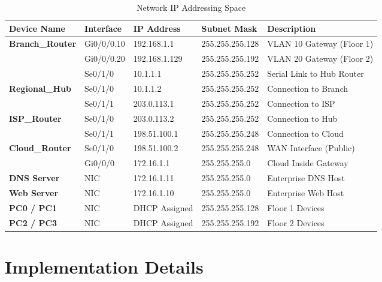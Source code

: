 \documentclass[12pt,a4paper]{article}
\begin{document}
\begin{table}[htbp]
\centering
\small
\caption{Network IP Addressing Space}
\begin{tabular}{lllll}
\toprule
\textbf{Device Name} & \textbf{Interface} & \textbf{IP Address} & \textbf{Subnet Mask} & \textbf{Description} \\ \midrule
\textbf{Branch\_Router} & Gi0/0/0.10 & 192.168.1.1 & 255.255.255.128 & VLAN 10 Gateway (Floor 1) \\
 & Gi0/0/0.20 & 192.168.1.129 & 255.255.255.192 & VLAN 20 Gateway (Floor 2) \\
 & Se0/1/0 & 10.1.1.1 & 255.255.255.252 & Serial Link to Hub Router \\ \midrule
\textbf{Regional\_Hub} & Se0/1/0 & 10.1.1.2 & 255.255.255.252 & Connection to Branch \\
 & Se0/1/1 & 203.0.113.1 & 255.255.255.252 & Connection to ISP \\ \midrule
\textbf{ISP\_Router} & Se0/1/0 & 203.0.113.2 & 255.255.255.252 & Connection to Hub \\
 & Se0/1/1 & 198.51.100.1 & 255.255.255.248 & Connection to Cloud \\ \midrule
\textbf{Cloud\_Router} & Se0/1/0 & 198.51.100.2 & 255.255.255.248 & WAN Interface (Public) \\
 & Gi0/0/0 & 172.16.1.1 & 255.255.255.0 & Cloud Inside Gateway \\ \midrule
\textbf{DNS Server} & NIC & 172.16.1.11 & 255.255.255.0 & Enterprise DNS Host \\
\textbf{Web Server} & NIC & 172.16.1.10 & 255.255.255.0 & Enterprise Web Host \\ \midrule
\textbf{PC0 / PC1} & NIC & DHCP Assigned & 255.255.255.128 & Floor 1 Devices \\
\textbf{PC2 / PC3} & NIC & DHCP Assigned & 255.255.255.192 & Floor 2 Devices \\ \bottomrule
\end{tabular}
\end{table}

\section{Implementation Details}
\end{document}
